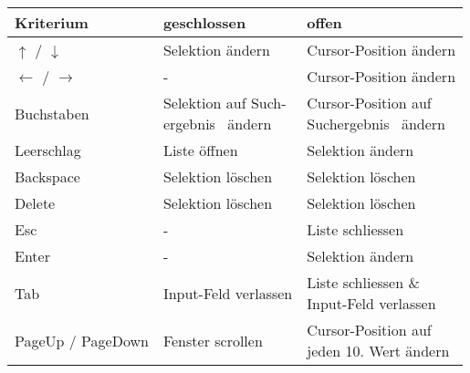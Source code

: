 \begin{table}[!htb] 
    \label{table:interactionNewComponent}
    \footnotesize
    \begin{adjustbox}{max width=0.95\textwidth}
        \begin{threeparttable}
            \begin{tabular}{ l || l | l }
                \bf{Kriterium}    & \bf{geschlossen} & \bf{offen} \\
                \hline \hline
                $\uparrow$ / $\downarrow$    & Selektion ändern & Cursor-Position ändern                 \\
                \hline
                $\leftarrow$ / $\rightarrow$ & -                & Cursor-Position ändern                 \\
                \hline
                Buchstaben  & \tbbr{Selektion auf Such-\\ 
                                    ergebnis\tnote{1} \ ändern} & \tbbr{Cursor-Position auf \\ 
                                                                        Suchergebnis\tnote{1} \ ändern}  \\
                \hline
                Leerschlag  & Liste öffnen                & Selektion ändern  \\
                \hline
                Backspace   & Selektion löschen           & Selektion löschen \\
                \hline
                Delete      & Selektion löschen           & Selektion löschen \\
                \hline
                Esc         & -                           & Liste schliessen  \\
                \hline \hline
                Enter       & -                           & Selektion ändern  \\
                \hline
                Tab         & Input-Feld verlassen        & \tbbr{Liste schliessen \& \\ 
                                                                  Input-Feld verlassen}                  \\
                \hline
                PageUp / PageDown & Fenster scrollen      & \tbbr{Cursor-Position auf \\ 
                                                                  jeden 10. Wert ändern}                 \\

\end{tabular}
\end{threeparttable}
\end{adjustbox}
\end{table}
